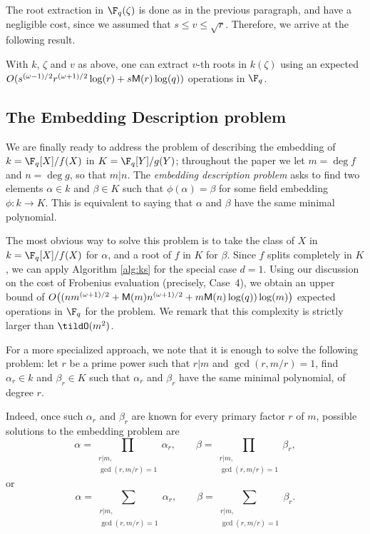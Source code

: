 The root extraction in $\F_q(\zeta)$ is done as in the previous
paragraph, and have a negligible cost, since we assumed that $s \le v
\le \sqrt{r}$. Therefore, we arrive at the following result.

\begin{proposition}\label{prop:root_high_degree_extension}
With $k$, $\zeta$ and $v$ as above, one can extract $v$-th roots in
$k(\zeta)$ using an expected
$O(s^{(\omega-1)/2}r^{(\omega+1)/2}\log(r) + s\mathsf{M}(r)\log(q))$
operations in $\F_q$.
\end{proposition}




\subsection{The Embedding Description problem}

We are finally ready to address the problem of describing the embedding of
$k=\F_q[X]/f(X)$ in $K=\F_q[Y]/g(Y)$; throughout the paper we let $m=\deg f$ and
$n=\deg g$, so that $m|n$. The \emph{embedding description problem}
asks to find two elements $\alpha\in k$ and $\beta\in K$ such that
$\phi(\alpha)=\beta$ for some field embedding $\phi:k\to K$. This is
equivalent to saying that $\alpha$ and $\beta$ have the same minimal polynomial.

The most obvious way to solve this problem is to take the class of $X$
in $k=\F_q[X]/f(X)$ for $\alpha$, and a root of $f$ in $K$ for
$\beta$. Since $f$ splits completely in $K$, we can apply Algorithm
\ref{alg:ks} for the special case $d = 1$. Using our discussion on the
cost of Frobenius evaluation (precisely, Case~4), we obtain an upper
bound of $O\bigl((nm^{(\omega+1)/2} + \mathsf{M}(m)n^{(\omega+1)/2} +
m\mathsf{M}(n)\log(q))\log(m)\bigr)$ expected operations in $\F_q$ for the
problem. We remark that this complexity is strictly larger than
$\tildO(m^2)$.

For a more specialized approach, we note that it is enough to solve
the following problem: let $r$ be a prime power such that $r|m$ and
$\gcd(r,m/r)=1$, find $\alpha_r\in k$ and $\beta_r\in K$ such that
$\alpha_r$ and $\beta_r$ have the same minimal polynomial, of degree $r$.

Indeed, once such $\alpha_r$ and $\beta_r$ are known for every primary
factor $r$ of $m$, possible solutions to the embedding problem are
\begin{equation*}
  \alpha = \prod_{\substack{r|m,\\\gcd(r,m/r)=1}}\alpha_r,\qquad
  \beta = \prod_{\substack{r|m,\\\gcd(r,m/r)=1}}\beta_r,
\end{equation*}
or
\begin{equation*}
  \alpha = \sum_{\substack{r|m,\\\gcd(r,m/r)=1}}\alpha_r,\qquad
  \beta = \sum_{\substack{r|m,\\\gcd(r,m/r)=1}}\beta_r.
\end{equation*}

